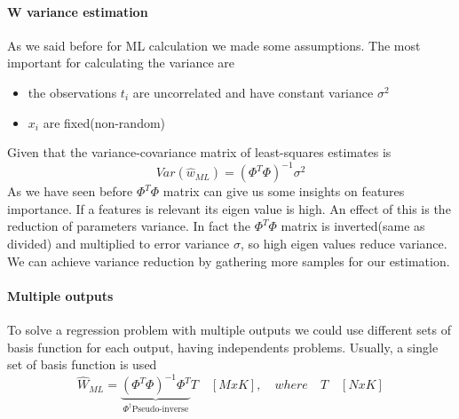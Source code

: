 \documentclass[../main.tex]{subfiles}
\begin{document}
\paragraph{W variance estimation} As we said before for ML calculation we made some assumptions. The most important for calculating the variance are
\begin{itemize}
    \item the observations $t_i$ are uncorrelated and have constant variance $\sigma^2$
    \item $x_i$ are fixed(non-random)
\end{itemize}
Given that the variance-covariance matrix of least-squares estimates is
\begin{equation}
    Var(\hat{w}_{ML})=(\Phi^T\Phi)^{-1}\sigma^2
\end{equation}
As we have seen before $\Phi^T\Phi$ matrix can give us some insights on features importance. If a features is relevant its eigen value is high. An effect of this is the reduction of parameters variance. In fact the $\Phi^T\Phi$ matrix is inverted(same as divided) and multiplied to error variance $\sigma$, so high eigen values reduce variance.
We can achieve variance reduction by gathering more samples for our estimation.

\paragraph{Multiple outputs} To solve a regression problem with multiple outputs we could use different sets of basis function for each output, having independents problems. Usually, a single set of basis function is used
\begin{equation}
    \hat{W}_{ML}=\underbrace{(\Phi^T\Phi)^{-1}\Phi^T}_{\Phi^{\dagger} \text{Pseudo-inverse}} T\quad [MxK],\quad where \quad T \quad [NxK]
\end{equation}
\end{document}

